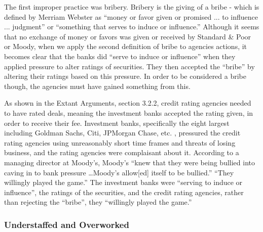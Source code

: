\documentclass[11pt]{article}
\begin{document}
\begin{multicols}{2}
The first improper practice was bribery.  Bribery is the giving of a bribe - which is defined by Merriam Webster as ``money or favor given or promised ... to influence ... judgment'' or ``something that serves to induce or influence.'' \cite{bribeDef}  Although it seems that no exchange of money or favors was given or received by Standard \& Poor or Moody, when we apply the second definition of bribe to agencies actions, it becomes clear that the banks did ``serve to induce or influence'' when they applied pressure to alter ratings of securities.  They then accepted the ``bribe''\cite{bribeDef} by altering their ratings based on this pressure.  In order to be considered a bribe though, the agencies must have gained something from this.

As shown in the Extant Arguments, section 3.2.2, credit rating agencies needed to have rated deals, meaning the investment banks accepted the rating given, in order to receive their fee. \cite[p.210]{govtReport}  Investment banks, specifically the eight largest including Goldman Sachs, Citi, JPMorgan Chase, etc. \cite{ratingEthics}, pressured the credit rating agencies using unreasonably short time frames and threats of losing business, and the rating agencies were complaisant about it.  According to a managing director at Moody's, Moody's ``knew that they were being bullied into caving in to bank pressure \ldots Moody's allow[ed] itself to be bullied.''   ``They willingly played the game.'' \cite[p.210]{govtReport} The investment banks were ``serving to induce or influence''\cite{bribeDef}, the ratings of the securities, and the credit rating agencies, rather than rejecting the ``bribe'', they ``willingly played the game.'' 

\subsubsection{Understaffed and Overworked}


\end{multicols}
\end{document}
